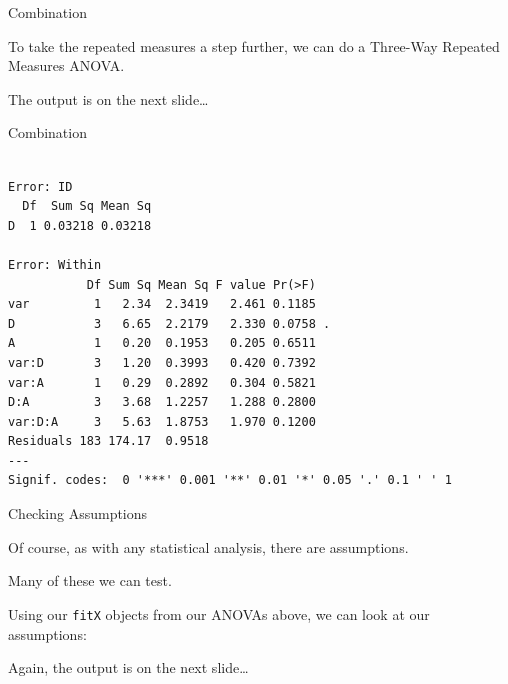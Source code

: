 \begin{frame}[fragile]{Combination}

To take the repeated measures a step further, we can do a Three-Way
Repeated Measures ANOVA.

\begin{Shaded}
\begin{Highlighting}[]
\StringTok{ }\OperatorTok{~}\StringTok{ }\OperatorTok{*}\StringTok{ }\OperatorTok{*}\StringTok{ }\OperatorTok{+}\StringTok{ }
\end{Highlighting}
\end{Shaded}

\center
\small
The output is on the next slide\ldots{}

\end{frame}

\begin{frame}[fragile]{Combination}

\small

\begin{verbatim}

Error: ID
  Df  Sum Sq Mean Sq
D  1 0.03218 0.03218

Error: Within
           Df Sum Sq Mean Sq F value Pr(>F)  
var         1   2.34  2.3419   2.461 0.1185  
D           3   6.65  2.2179   2.330 0.0758 .
A           1   0.20  0.1953   0.205 0.6511  
var:D       3   1.20  0.3993   0.420 0.7392  
var:A       1   0.29  0.2892   0.304 0.5821  
D:A         3   3.68  1.2257   1.288 0.2800  
var:D:A     3   5.63  1.8753   1.970 0.1200  
Residuals 183 174.17  0.9518                 
---
Signif. codes:  0 '***' 0.001 '**' 0.01 '*' 0.05 '.' 0.1 ' ' 1
\end{verbatim}

\end{frame}

\begin{frame}[fragile]{Checking Assumptions}

\center
Of course, as with any statistical analysis, there are assumptions.

Many of these we can test.

Using our \texttt{fitX} objects from our ANOVAs above, we can look at
our assumptions:

\begin{Shaded}
\begin{Highlighting}[]
\NormalTok{(} \NormalTok{(}\NormalTok{,}
\end{Highlighting}
\end{Shaded}

\center
\small
Again, the output is on the next slide\ldots{}

\end{frame}

